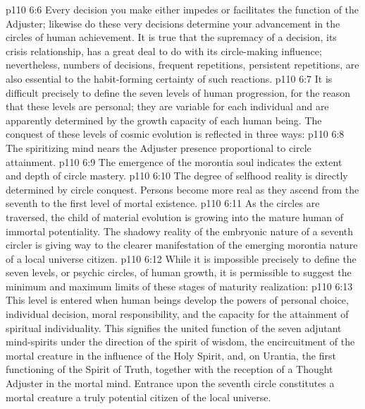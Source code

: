 \vs p110 6:6 \pc Every decision you make either impedes or facilitates the function of the Adjuster; likewise do these very decisions determine your advancement in the circles of human achievement. It is true that the supremacy of a decision, its crisis relationship, has a great deal to do with its circle\hyp{}making influence; nevertheless, numbers of decisions, frequent repetitions, persistent repetitions, are also essential to the habit\hyp{}forming certainty of such reactions.
\vs p110 6:7 It is difficult precisely to define the seven levels of human progression, for the reason that these levels are personal; they are variable for each individual and are apparently determined by the growth capacity of each human being. The conquest of these levels of cosmic evolution is reflected in three ways:
\vs p110 6:8 \bibnobreakspace {} The spiritizing mind nears the Adjuster presence proportional to circle attainment.
\vs p110 6:9 \bibnobreakspace {} The emergence of the morontia soul indicates the extent and depth of circle mastery.
\vs p110 6:10 \bibnobreakspace {} The degree of selfhood reality is directly determined by circle conquest. Persons become more real as they ascend from the seventh to the first level of mortal existence.
\vs p110 6:11 \pc As the circles are traversed, the child of material evolution is growing into the mature human of immortal potentiality. The shadowy reality of the embryonic nature of a seventh circler is giving way to the clearer manifestation of the emerging morontia nature of a local universe citizen.
\vs p110 6:12 While it is impossible precisely to define the seven levels, or psychic circles, of human growth, it is permissible to suggest the minimum and maximum limits of these stages of maturity realization:
\vs p110 6:13 \pc {} This level is entered when human beings develop the powers of personal choice, individual decision, moral responsibility, and the capacity for the attainment of spiritual individuality. This signifies the united function of the seven adjutant mind\hyp{}spirits under the direction of the spirit of wisdom, the encircuitment of the mortal creature in the influence of the Holy Spirit, and, on Urantia, the first functioning of the Spirit of Truth, together with the reception of a Thought Adjuster in the mortal mind. Entrance upon the seventh circle constitutes a mortal creature a truly potential citizen of the local universe.

